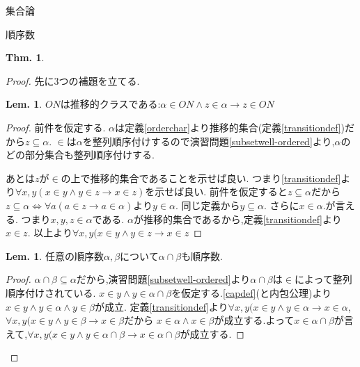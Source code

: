 \documentclass[14pt]{jsarticle}
\theoremstyle{definition}
\newtheorem{thm}[dfn]{Thm.}
\newtheorem{lem}[dfn]{Lem.}
\begin{document}
\begin{section}{集合論}
\begin{subsection}{順序数}
\begin{thm}
\end{thm}
\begin{proof}
先に3つの補題を立てる.
\begin{lem}
\label{ONtransitive}
$ON$は推移的クラスである:$\alpha \in ON \land z\in\alpha \to z\in ON$
\end{lem}
\begin{proof}
前件を仮定する.
$\alpha$は定義\ref{orderchar}より推移的集合(定義\ref{transitiondef})だから$z\subseteq\alpha$.
$\in$は$\alpha$を整列順序付けするので演習問題\ref{subsetwell-ordered}より,$\alpha$のどの部分集合も整列順序付けする.\par
あとは$z$が$\in$の上で推移的集合であることを示せば良い.
つまり\ref{transitiondef}より$\forall x,y(x\in y \land y \in z \to x\in z)$を示せば良い.
前件を仮定すると$z\subseteq\alpha$だから$z\subseteq\alpha\Leftrightarrow\forall a(a\in z\to a\in\alpha)$より$y\in \alpha$.
同じ定義から$y\subseteq\alpha$.
さらに$x\in\alpha$.が言える.
つまり$x,y,z\in\alpha$である.
$\alpha$が推移的集合であるから,定義\ref{transitiondef}より$x\in z$.
以上より$\forall x,y (x\in y \land y\in z \to x\in z$
\end{proof}

\begin{lem}
\label{ONcap}
任意の順序数$\alpha,\beta$について$\alpha\cap\beta$も順序数.
\end{lem}
\begin{proof}
$\alpha\cap\beta\subseteq\alpha$だから,演習問題\ref{subsetwell-ordered}より$\alpha\cap\beta$は$\in$によって整列順序付けされている.
$x\in y \land y \in \alpha\cap\beta$を仮定する.\ref{capdef}(と内包公理)より$x\in y\land y\in\alpha\land y\in\beta$が成立.
定義\ref{transitiondef}より$\forall x,y(x\in y \land y \in \alpha \to x\in\alpha$,$\forall x,y(x\in y \land y \in \beta \to x\in\beta$だから
$x\in\alpha \land x\in\beta$が成立する.よって$x\in\alpha\cap\beta$が言えて,$\forall x,y(x\in y \land y \in\alpha\cap\beta \to x\in\alpha\cap\beta$が成立する.
\end{proof}


\end{proof}
\end{subsection}
\end{section}
\end{document}
